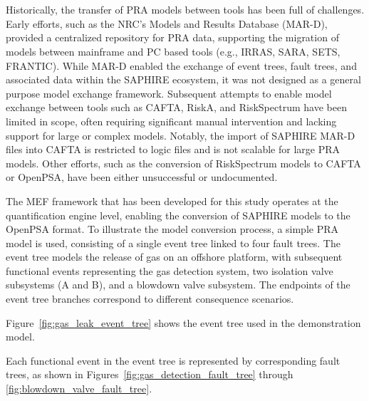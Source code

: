 \section{\color{blue}{Model Conversion from SAPHIRE to OpenPSA}}

% 

Historically, the transfer of PRA models between tools has been full of challenges. Early efforts, such as the NRC's Models and Results Database (MAR-D), provided a centralized repository for PRA data, supporting the migration of models between mainframe and PC based tools (e.g., IRRAS, SARA, SETS, FRANTIC). While MAR-D enabled the exchange of event trees, fault trees, and associated data within the SAPHIRE ecosystem, it was not designed as a general purpose model exchange framework. Subsequent attempts to enable model exchange between tools such as CAFTA, RiskA, and RiskSpectrum have been limited in scope, often requiring significant manual intervention and lacking support for large or complex models. Notably, the import of SAPHIRE MAR-D files into CAFTA is restricted to logic files and is not scalable for large PRA models. Other efforts, such as the conversion of RiskSpectrum models to CAFTA or OpenPSA, have been either unsuccessful or undocumented.

The MEF framework that has been developed for this study operates at the quantification engine level, enabling the conversion of SAPHIRE models to the OpenPSA format. To illustrate the model conversion process, a simple PRA model is used, consisting of a single event tree linked to four fault trees. The event tree models the release of gas on an offshore platform, with subsequent functional events representing the gas detection system, two isolation valve subsystems (A and B), and a blowdown valve subsystem. The endpoints of the event tree branches correspond to different consequence scenarios.

Figure~\ref{fig:gas_leak_event_tree} shows the event tree used in the demonstration model.



Each functional event in the event tree is represented by corresponding fault trees, as shown in Figures~\ref{fig:gas_detection_fault_tree} through \ref{fig:blowdown_valve_fault_tree}.





